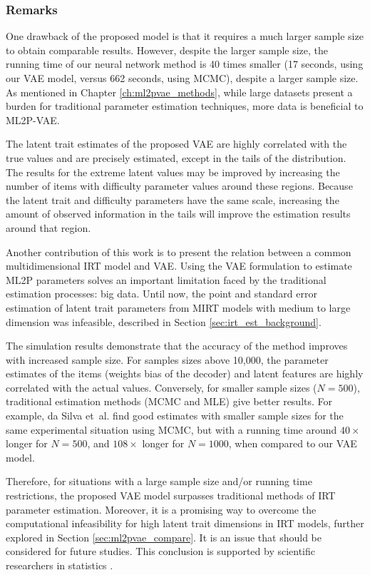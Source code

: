 \subsubsection{Remarks}
One drawback of the proposed model is that it requires a much larger sample size to obtain comparable results. However, despite the larger sample size, the running time of our neural network method is 40 times smaller (17 seconds, using our VAE model, versus 662 seconds, using MCMC), despite a larger sample size. As mentioned in Chapter \ref{ch:ml2pvae_methods}, while large datasets present a burden for traditional parameter estimation techniques, more data is beneficial to ML2P-VAE.

The latent trait estimates of the proposed VAE are highly correlated with the true values and are precisely estimated, except in the tails of the distribution. The results for the extreme latent values may be improved by increasing the number of items with difficulty parameter values around these regions. Because the latent trait and difficulty parameters have the same scale, increasing the amount of observed information in the tails will improve the estimation results around that region. 

Another contribution of this work is to present the relation between a common multidimensional IRT model and VAE. Using the VAE formulation to estimate ML2P parameters solves an important limitation faced by the traditional estimation processes: big data. Until now, the point and standard error estimation of latent trait parameters from MIRT models with medium to large dimension was infeasible, described in Section \ref{sec:irt_est_background}.

The simulation results demonstrate that the accuracy of the method improves with increased sample size. For samples sizes above 10,000, the parameter estimates of the items (weights bias of the decoder) and latent features are highly correlated with the actual values. Conversely, for smaller sample sizes ($N=500$), traditional estimation methods (MCMC and MLE) give better results. For example, da Silva et~al. \cite{daSilva2018} find good estimates with smaller sample sizes for the same experimental situation using MCMC, but with a running time around $40\times$ longer for $N=500$, and $108\times$ longer for $N=1000$, when compared to our VAE model.

Therefore, for situations with a large sample size and/or running time restrictions, the proposed VAE model surpasses traditional methods of IRT parameter estimation. Moreover, it is a promising way to overcome the computational infeasibility for high latent trait dimensions in IRT models, further explored in Section \ref{sec:ml2pvae_compare}. It is an issue that should be considered for future studies. This conclusion is supported by scientific researchers in statistics \cite{Blei2017}. 

